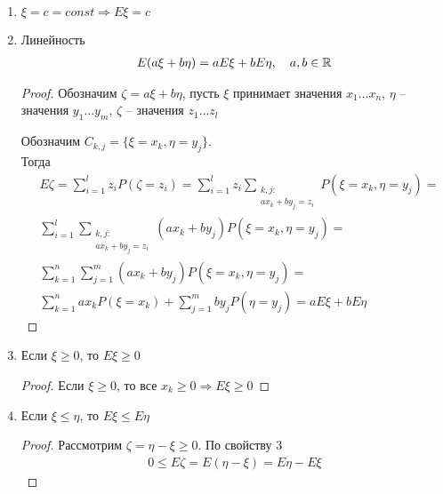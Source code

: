 \begin{enumerate}
  \item $\xi = c = const \Rightarrow E\xi = c$
  \item 
    Линейность
    \begin{align*}
      E(a\xi + b\eta) = a E \xi + b E \eta, \quad a, b \in \mathbb{R}
    \end{align*}

    \begin{proof}
      Обозначим $\zeta = a\xi + b\eta$, пусть $\xi$ принимает значения $x_1 \ldots x_n$, 
      $\eta$ -- значения $y_1 \ldots y_m$, $\zeta$ -- значения $z_1 \ldots z_l$

      Обозначим $C_{k, j} = \{ \xi = x_k, \eta = y_j \}$.\\
      Тогда 
      \begin{align*}
        &E\zeta = \sum_{i = 1}^l z_i P(\zeta = z_i) = \sum_{i = 1}^l z_i 
        \sum_{\substack{k,j:\\ a x_k + b y_j = z_i}} P(\xi = x_k, \eta = y_j) =\\
        &\sum_{i = 1}^l \sum_{\substack{k,j:\\ a x_k + b y_j = z_i}} (a x_k + b y_j) 
        P(\xi = x_k, \eta = y_j) =\\
        &\sum_{k = 1}^n \sum_{j = 1}^m (a x_k + b y_j) P(\xi = x_k, \eta = y_j) =\\
        &\sum_{k = 1}^n a x_k P(\xi = x_k) + \sum_{j = 1}^m b y_j P(\eta = y_j) = a E \xi + b E \eta
      \end{align*}

    \end{proof}

  \item Если $\xi \geq 0$, то $E \xi \geq 0$
    \begin{proof}
      Если $\xi \geq 0$, то все $x_k \geq 0 \Rightarrow E \xi \geq 0$
    \end{proof}

  \item Если $\xi \leq \eta$, то $E \xi \leq E \eta$
    \begin{proof}
      Рассмотрим $\zeta = \eta - \xi \geq 0$. По свойству 3\\
        \begin{align*}
          0 \leq E \zeta = E (\eta - \xi) = E \eta - E \xi
        \end{align*}
    \end{proof}
\end{enumerate}



